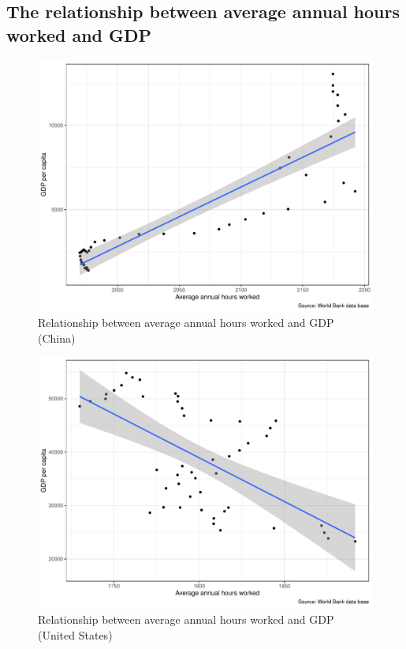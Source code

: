 \documentclass[11pt,a4paper,]{article}
\begin{document}
\clearpage

\hypertarget{the-relationship-between-average-annual-hours-worked-and-gdp}{%
\subsection{The relationship between average annual hours worked and GDP}\label{the-relationship-between-average-annual-hours-worked-and-gdp}}

\begin{figure}
\centering
\includegraphics{report_files/figure-latex/Figure3-1.pdf}
\caption{\label{fig:Figure3}Relationship between average annual hours worked and GDP (China)}
\end{figure}

\begin{figure}
\centering
\includegraphics{report_files/figure-latex/Figure4-1.pdf}
\caption{\label{fig:Figure4}Relationship between average annual hours worked and GDP (United States)}
\end{figure}
\end{document}
